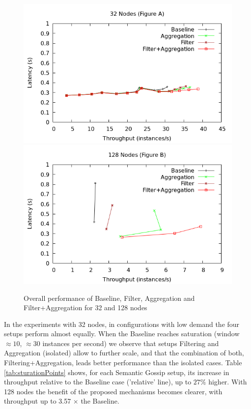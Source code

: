 \begin{figure}[htbp]
\centering
\includegraphics[width=\columnwidth]{figures/32nodes-final.png}
\includegraphics[width=\columnwidth]{figures/128nodes-final.png}
\caption{Overall performance of Baseline, Filter, Aggregation and Filter+Aggregation for 32 and 128 nodes}
\label{fig:overallTendermint}
\end{figure}


In the experiments with 32 nodes,
in configurations with low demand the four setups perform almost equally. When the Baseline reaches saturation (window  $\approx 10$, $\approx 30$ instances per second) we observe that setups Filtering and Aggregation (isolated) allow to further scale, and that the combination of both, Filtering+Aggregation, leads better performance than the isolated cases.  
Table \ref{tab:sturationPoints} shows, for each Semantic Gossip setup, its increase in throughput relative to the Baseline case ('relative' line), up to $ 27 \%$ higher.
%
With 128 nodes the benefit of the proposed mechanisms becomes clearer,
with throughput up to 3.57 $\times$ the Baseline.

